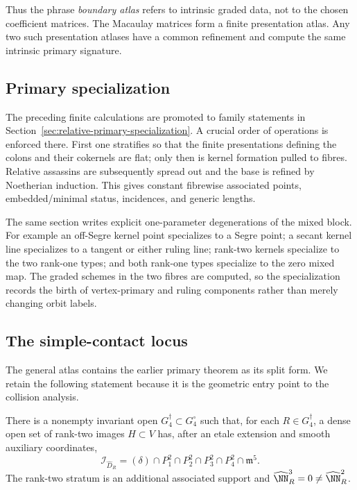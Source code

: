 Thus the phrase \emph{boundary atlas} refers to intrinsic graded
data, not to the chosen coefficient matrices.  The Macaulay matrices
form a finite presentation atlas.  Any two such presentation atlases
have a common refinement and compute the same intrinsic primary
signature.

\subsection{Primary specialization}

The preceding finite calculations are promoted to family statements
in Section~\ref{sec:relative-primary-specialization}.  A crucial
order of operations is enforced there.  First one stratifies so that
the finite presentations defining the colons and their cokernels are
flat; only then is kernel formation pulled to fibres.  Relative
assassins are subsequently spread out and the base is refined by
Noetherian induction.  This gives constant fibrewise associated
points, embedded/minimal status, incidences, and generic lengths.

The same section writes explicit one-parameter degenerations of the
mixed block.  For example an off-Segre kernel point specializes to a
Segre point; a secant kernel line specializes to a tangent or either
ruling line; rank-two kernels specialize to the two rank-one types;
and both rank-one types specialize to the zero mixed map.  The
graded schemes in the two fibres are computed, so the specialization
records the birth of vertex-primary and ruling components rather than
merely changing orbit labels.

\subsection{The simple-contact locus}

The general atlas contains the earlier primary theorem as its split
form.  We retain the following statement because it is the geometric
entry point to the collision analysis.

\begin{theorem}
\label{thm:main-coranktwo}
There is a nonempty invariant open
\(G_4^\dagger\subset G_4^\circ\) such that, for each
\(R\in G_4^\dagger\), a dense open set of rank-two images
\(H\subset V\) has, after an etale extension and smooth auxiliary
coordinates,
\[
 \mathcal I_{\widehat D_R}
 =
 (\delta)\cap P_1^2\cap P_2^2\cap P_3^2\cap P_4^2
 \cap\mathfrak m^5.
\]
The rank-two stratum is an additional associated support and
\(\widehat\NN_R^3=0\ne\widehat\NN_R^2\).
\end{theorem}

